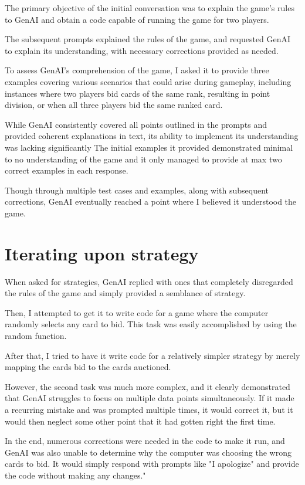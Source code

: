 \documentclass[10pt,onecolumn,letterpaper]{article}
\begin{document}
The primary objective of the initial conversation was to explain the game's rules to GenAI and obtain a code capable of running the game for two players.

The subsequent prompts explained the rules of the game, and requested GenAI to explain its understanding, with necessary corrections provided as needed.

To assess GenAI's comprehension of the game, I asked it to provide three examples covering various scenarios that could arise during gameplay, including instances where two players bid cards of the same rank, resulting in point division, or when all three players bid the same ranked card.

While GenAI consistently covered all points outlined in the prompts and provided coherent explanations in text, its ability to implement its understanding was lacking significantly The initial examples it provided demonstrated minimal to no understanding of the game and it only managed to provide at max two correct examples in each response.

Though through multiple test cases and examples, along with subsequent corrections, GenAI eventually reached a point where I believed it understood the game.

\section{Iterating upon strategy}
When asked for strategies, GenAI replied with ones that completely disregarded the rules of the game and simply provided a semblance of strategy.

Then, I attempted to get it to write code for a game where the computer randomly selects any card to bid. This task was easily accomplished by using the random function.

After that, I tried to have it write code for a relatively simpler strategy by merely mapping the cards bid to the cards auctioned.

However, the second task was much more complex, and it clearly demonstrated that GenAI struggles to focus on multiple data points simultaneously. If it made a recurring mistake and was prompted multiple times, it would correct it, but it would then neglect some other point that it had gotten right the first time.

In the end, numerous corrections were needed in the code to make it run, and GenAI was also unable to determine why the computer was choosing the wrong cards to bid. It would simply respond with prompts like "I apologize" and provide the code without making any changes."
\end{document}
